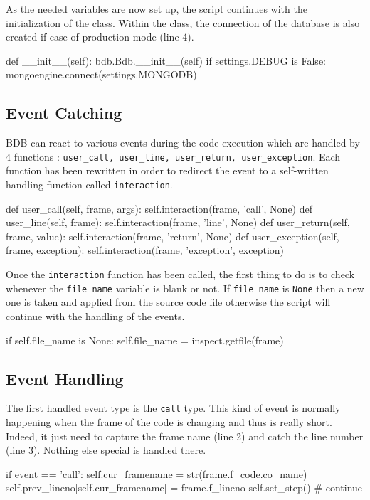 As the needed variables are now set up, the script continues with the initialization of the  class. Within the class, the connection of the database is also created if case of production mode (line 4). 

\begin{python}
def __init__(self):
    bdb.Bdb.__init__(self)
    if settings.DEBUG is False:
        mongoengine.connect(settings.MONGODB)
\end{python}

\subsection{Event Catching}

BDB can react to various events during the code execution which are handled by 4 functions : \texttt{user\_call, user\_line, user\_return, user\_exception}. Each function has been rewritten in order to redirect the event to a self-written handling function called \texttt{interaction}. 
\smallskip
\begin{python}
def user_call(self, frame, args):
    self.interaction(frame, 'call', None)
def user_line(self, frame):
    self.interaction(frame, 'line', None)
def user_return(self, frame, value):
    self.interaction(frame, 'return', None)
def user_exception(self, frame, exception):
    self.interaction(frame, 'exception', exception)
\end{python}

Once the \texttt{interaction} function has been called, the first thing to do is to check whenever the \texttt{file\_name} variable is blank or not. If \texttt{file\_name} is \texttt{None} then a new one is taken and applied from the source code file otherwise the script will continue with the handling of the events.
\begin{python}
if self.file_name is None:
    self.file_name = inspect.getfile(frame)
\end{python}

\subsection{Event Handling}
The first handled event type is the \texttt{call} type. This kind of event is normally happening when the frame of the code is changing and thus is really short. Indeed, it just need to capture the frame name (line 2) and catch the line number (line 3). Nothing else special is handled there.
\begin{python}
if event == 'call':
    self.cur_framename = str(frame.f_code.co_name)
    self.prev_lineno[self.cur_framename] = frame.f_lineno
    self.set_step() # continue
\end{python}

